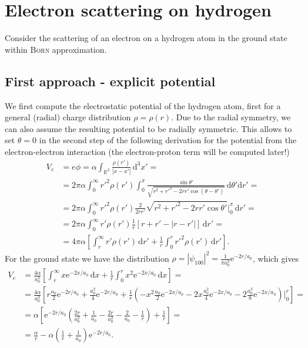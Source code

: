 \documentclass[english, parskip=full]{scrartcl}
\newcommand{\intx}{}
\newcommand{\intr}{}
\newcommand{\kla}{}
\newcommand{\klam}{}
\def\e{\text{e}}
\begin{document}
\section{Electron scattering on hydrogen}
Consider the scattering of an electron on a hydrogen atom in the ground state within \textsc{Born} approximation.
\\
\subsection{First approach - explicit potential}
We first compute the electrostatic potential of the hydrogen atom, first for a general (radial) charge distribution $\rho=\rho(r)$.
Due to the radial symmetry, we can also assume the resulting potential to be radially symmetric. 
This allows to set $\theta=0$ in the second step of the following derivation for the potential from the electron-electron interaction (the electron-proton term will be computed later!)
\begin{align}
V_e&=e\phi=\alpha\intr\int_{\mathbb{R}^{3}}{\frac{\rho (r')}{|x-x'|}}\,\mathrm{d}^{3}x'=\\
&=2\pi\alpha\intx\int_{0}^{\infty}r'^2\rho(r')\int_0^\pi\frac{\sin\theta'}{\sqrt{r^2+r'^2-2rr'\cos(\theta-\theta')}}\,\mathrm{d}\theta'\mathrm{d}r'=\\
&=2\pi\alpha\intx\int_{0}^{\infty}r'^2\rho(r')\frac{2}{2rr'}\sqrt{r^2+r'^2-2rr'\cos\theta'}\bigg\vert_0^\pi\,\mathrm{d}r'=\\
&=2\pi\alpha\intx\int_0^\infty r'\rho(r')\frac{1}{r}\klam\left[ {r+r'-|r-r'|} \right]\,\mathrm{d}r'=\\
&=4\pi\alpha\klam\left[ {\intx\int_{r}^{\infty}r'\rho(r')\,\mathrm{d}r'+\frac{1}{r}\intx\int_{0}^{r}r'^2\rho(r')\,\mathrm{d}r'} \right].
\end{align}
For the ground state we have the distribution $\rho=|\psi_{100}|^2=\frac{1}{\pi a_0^3}\e^{-2r/a_0}$, which gives
\begin{align}
V_e &=\frac{4\alpha}{a_0^3}\klam\left[ \intx\int_{r}^{\infty}x\e^{-2x/a_0}\,\mathrm{d}x+\frac{1}{r}\intx\int_{0}^{r}x^2\e^{-2x/a_0}\,\mathrm{d}x \right]=\\
&=\frac{4\alpha}{a_0^3}\klam\left[ r\frac{a_0}{2}\e^{-2r/a_0}+\frac{a_0^2}{4}\e^{-2r/a_0}+\frac{1}{r}\kla\left( -x^2\frac{a_0}{2}\e^{-2x/a_0}-2x\frac{a_0^2}{4}\e^{-2x/a_0}-2\frac{a_0^3}{8}\e^{-2x/a_0} \right)\bigg\vert_0^r \right]=\\
&=\alpha\klam\left[ {\e^{-2r/a_0}\kla\left( \frac{2r}{a_0^2}+\frac{1}{a_0}-\frac{2r}{a_0^2}-\frac{2}{a_0}-\frac{1}{r} \right)+\frac{1}{r}} \right]=\\
&=\frac{\alpha}{r}-\alpha\kla\left( {\frac{1}{r}+\frac{1}{a_0}} \right)\e^{-2r/a_0}.
\end{align}
\end{document}
